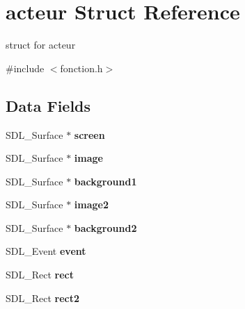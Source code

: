 \hypertarget{structacteur}{}\section{acteur Struct Reference}
\label{structacteur}


struct for acteur  




{\ttfamily \#include $<$fonction.\+h$>$}

\subsection*{Data Fields}
\begin{DoxyCompactItemize}
\item 
\mbox{\label{structacteur_a07a96e94e6c43095e9fab0d1f077e3ac}} 
S\+D\+L\+\_\+\+Surface $\ast$ {\bfseries screen}
\item 
\mbox{\label{structacteur_ad45d4021795636e16e5785fbfa152530}} 
S\+D\+L\+\_\+\+Surface $\ast$ {\bfseries image}
\item 
\mbox{\label{structacteur_a631b8442e4264750afc914b800105b0a}} 
S\+D\+L\+\_\+\+Surface $\ast$ {\bfseries background1}
\item 
\mbox{\label{structacteur_ac0054a0e942511dc6b7f1a36d12e5813}} 
S\+D\+L\+\_\+\+Surface $\ast$ {\bfseries image2}
\item 
\mbox{\label{structacteur_a9ad6e759e8c6207dfc6f52ad0308a406}} 
S\+D\+L\+\_\+\+Surface $\ast$ {\bfseries background2}
\item 
\mbox{\label{structacteur_a5cbc6efc9f05581578b5adc9bcc3c15c}} 
S\+D\+L\+\_\+\+Event {\bfseries event}
\item 
\mbox{\label{structacteur_a6c0d04ec13207c162908f6337da3811a}} 
S\+D\+L\+\_\+\+Rect {\bfseries rect}
\item 
\mbox{\label{structacteur_a2482ac60203e9183250f1288f8d2d6de}} 
S\+D\+L\+\_\+\+Rect {\bfseries rect2}
\item 
\mbox{\label{structacteur_a8143c336841efa3650723cbfa8e9e072}} 

\end{DoxyCompactItemize}

